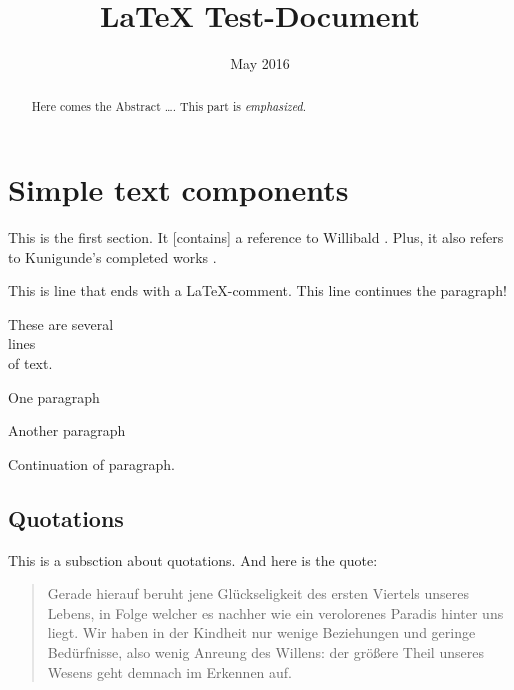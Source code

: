 \documentclass[12pt, english, a4paper]{article}
\begin{document}
\title{LaTeX Test-Document}

\date{May 2016}
 
\maketitle

\begin{abstract}
Here comes the Abstract \ldots. This part is {\em emphasized}.
\end{abstract}

\newpage

\tableofcontents

\section{Simple text components}

This is the first section. It [contains] a reference to
Willibald \citet[32]{Willibald2015}. Plus, it also refers to
Kunigunde's completed works \citep{Kunigunde2010}.

This is line that ends with a LaTeX-comment. %
This line continues the paragraph!

These are several \\
lines \\
of text.

One paragraph

Another paragraph


Continuation of paragraph.

\subsection{Quotations}

This is a subsction about quotations. And here is the quote:

\begin{quote}
    Gerade hierauf beruht jene Glückseligkeit des ersten Viertels unseres Lebens,
    in Folge welcher es nachher wie ein verolorenes Paradis hinter uns liegt.
    Wir haben in der Kindheit nur wenige Beziehungen und geringe Bedürfnisse, also wenig
    Anreung des Willens: der größere Theil unseres Wesens geht demnach im Erkennen auf.
    \cite[199]{Schopenhauer1851}
\end{quote}
\end{document}
